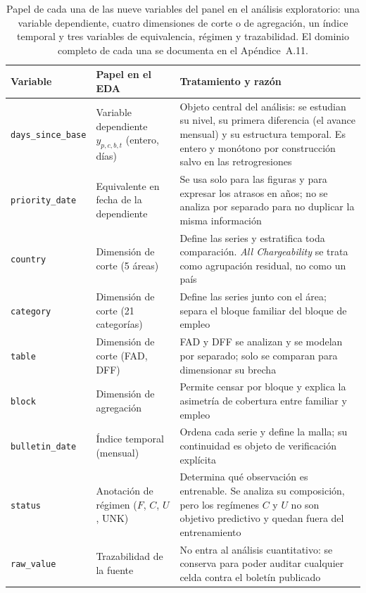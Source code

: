 \documentclass[12pt,letterpaper]{report}
\begin{document}
\begin{table}[H]
\centering
\footnotesize
\caption[Variables del panel en el análisis exploratorio]{Papel de cada una de las nueve
variables del panel en el análisis exploratorio: una variable dependiente, cuatro dimensiones
de corte o de agregación, un índice temporal y tres variables de equivalencia, régimen y
trazabilidad. El dominio completo de cada una se documenta en el Apéndice~A.11.}
\label{tab:eda_variables}
\begin{tabular}{p{3.2cm}>{\raggedright\arraybackslash}p{3.3cm}>{\raggedright\arraybackslash}p{7.1cm}}
\toprule
\rowcolor{uacjblue!15}
\textbf{Variable} & \textbf{Papel en el EDA} & \textbf{Tratamiento y razón} \\ \midrule
\texttt{days\_since\_base} & Variable dependiente $y_{p,c,b,t}$ (entero, días) &
Objeto central del análisis: se estudian su nivel, su primera diferencia (el avance mensual)
y su estructura temporal. Es entero y monótono por construcción salvo en las retrogresiones \\
\texttt{priority\_date} & Equivalente en fecha de la dependiente &
Se usa solo para las figuras y para expresar los atrasos en años; no se analiza por separado
para no duplicar la misma información \\
\texttt{country} & Dimensión de corte (5 áreas) &
Define las series y estratifica toda comparación. \textit{All Chargeability} se trata como
agrupación residual, no como un país \\
\texttt{category} & Dimensión de corte (21 categorías) &
Define las series junto con el área; separa el bloque familiar del bloque de empleo \\
\texttt{table} & Dimensión de corte (FAD, DFF) &
FAD y DFF se analizan y se modelan por separado; solo se comparan para dimensionar su brecha \\
\texttt{block} & Dimensión de agregación &
Permite censar por bloque y explica la asimetría de cobertura entre familiar y empleo \\
\texttt{bulletin\_date} & Índice temporal (mensual) &
Ordena cada serie y define la malla; su continuidad es objeto de verificación explícita \\
\texttt{status} & Anotación de régimen ($F$, $C$, $U$, UNK) &
Determina qué observación es entrenable. Se analiza su composición, pero los regímenes
$C$ y $U$ no son objetivo predictivo y quedan fuera del entrenamiento \\
\texttt{raw\_value} & Trazabilidad de la fuente &
No entra al análisis cuantitativo: se conserva para poder auditar cualquier celda contra el
boletín publicado \\
\bottomrule
\end{tabular}
\end{table}
\end{document}
